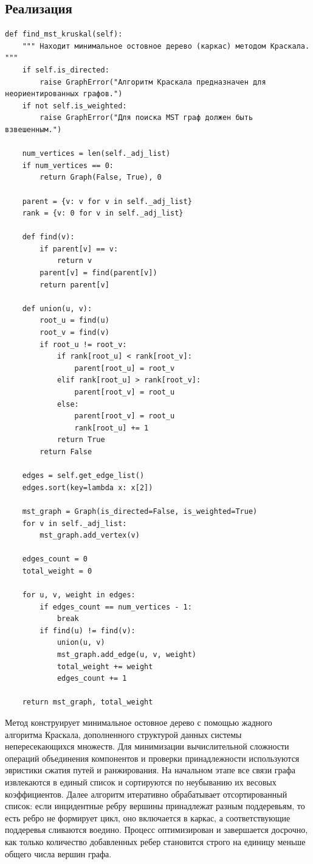 \documentclass[referat]{SCWorks}
\begin{document}
    \subsection{Реализация}

    \begin{verbatim}
def find_mst_kruskal(self):
    """ Находит минимальное остовное дерево (каркас) методом Краскала. """
    if self.is_directed:
        raise GraphError("Алгоритм Краскала предназначен для неориентированных графов.")
    if not self.is_weighted:
        raise GraphError("Для поиска MST граф должен быть взвешенным.")

    num_vertices = len(self._adj_list)
    if num_vertices == 0:
        return Graph(False, True), 0

    parent = {v: v for v in self._adj_list}
    rank = {v: 0 for v in self._adj_list}

    def find(v):
        if parent[v] == v:
            return v
        parent[v] = find(parent[v])
        return parent[v]

    def union(u, v):
        root_u = find(u)
        root_v = find(v)
        if root_u != root_v:
            if rank[root_u] < rank[root_v]:
                parent[root_u] = root_v
            elif rank[root_u] > rank[root_v]:
                parent[root_v] = root_u
            else:
                parent[root_v] = root_u
                rank[root_u] += 1
            return True
        return False

    edges = self.get_edge_list()
    edges.sort(key=lambda x: x[2])

    mst_graph = Graph(is_directed=False, is_weighted=True)
    for v in self._adj_list:
        mst_graph.add_vertex(v)

    edges_count = 0
    total_weight = 0

    for u, v, weight in edges:
        if edges_count == num_vertices - 1:
            break
        if find(u) != find(v):
            union(u, v)
            mst_graph.add_edge(u, v, weight)
            total_weight += weight
            edges_count += 1

    return mst_graph, total_weight
    \end{verbatim}

    Метод конструирует минимальное остовное дерево с помощью жадного алгоритма Краскала, дополненного структурой данных системы непересекающихся множеств. Для минимизации вычислительной сложности операций объединения компонентов и проверки принадлежности используются эвристики сжатия путей и ранжирования. На начальном этапе все связи графа извлекаются в единый список и сортируются по неубыванию их весовых коэффициентов. Далее алгоритм итеративно обрабатывает отсортированный список: если инцидентные ребру вершины принадлежат разным поддеревьям, то есть ребро не формирует цикл, оно включается в каркас, а соответствующие поддеревья сливаются воедино. Процесс оптимизирован и завершается досрочно, как только количество добавленных ребер становится строго на единицу меньше общего числа вершин графа.
\end{document}
